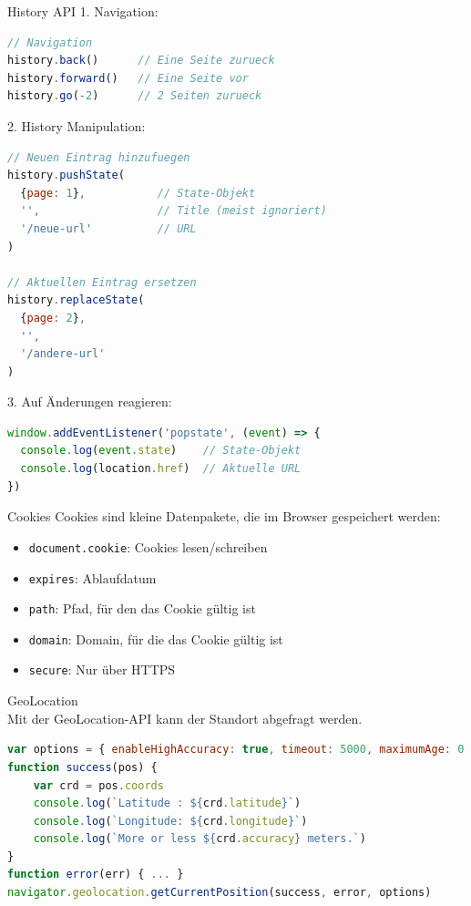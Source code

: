 \begin{KR}{History API}
1. Navigation:
\begin{lstlisting}[language=JavaScript, style=basesmol]
// Navigation
history.back()      // Eine Seite zurueck
history.forward()   // Eine Seite vor
history.go(-2)      // 2 Seiten zurueck
\end{lstlisting}

2. History Manipulation:
\begin{lstlisting}[language=JavaScript, style=basesmol]
// Neuen Eintrag hinzufuegen
history.pushState(
  {page: 1},           // State-Objekt
  '',                  // Title (meist ignoriert)
  '/neue-url'          // URL
)

// Aktuellen Eintrag ersetzen
history.replaceState(
  {page: 2},
  '',
  '/andere-url'
)
\end{lstlisting}

3. Auf Änderungen reagieren:
\begin{lstlisting}[language=JavaScript, style=basesmol]
window.addEventListener('popstate', (event) => {
  console.log(event.state)    // State-Objekt
  console.log(location.href)  // Aktuelle URL
})
\end{lstlisting}
\end{KR}

\begin{definition}{Cookies}
    Cookies sind kleine Datenpakete, die im Browser gespeichert werden:
    \begin{itemize}
        \item \texttt{document.cookie}: Cookies lesen/schreiben
        \item \texttt{expires}: Ablaufdatum
        \item \texttt{path}: Pfad, für den das Cookie gültig ist
        \item \texttt{domain}: Domain, für die das Cookie gültig ist
        \item \texttt{secure}: Nur über HTTPS
    \end{itemize}
\end{definition}

\begin{code}{GeoLocation}\\
Mit der GeoLocation-API kann der Standort abgefragt werden.

\begin{lstlisting}[language=JavaScript, style=basesmol]
var options = { enableHighAccuracy: true, timeout: 5000, maximumAge: 0 }
function success(pos) {
    var crd = pos.coords
    console.log(`Latitude : ${crd.latitude}`)
    console.log(`Longitude: ${crd.longitude}`)
    console.log(`More or less ${crd.accuracy} meters.`)
}
function error(err) { ... }
navigator.geolocation.getCurrentPosition(success, error, options)
\end{lstlisting}
\end{code}


